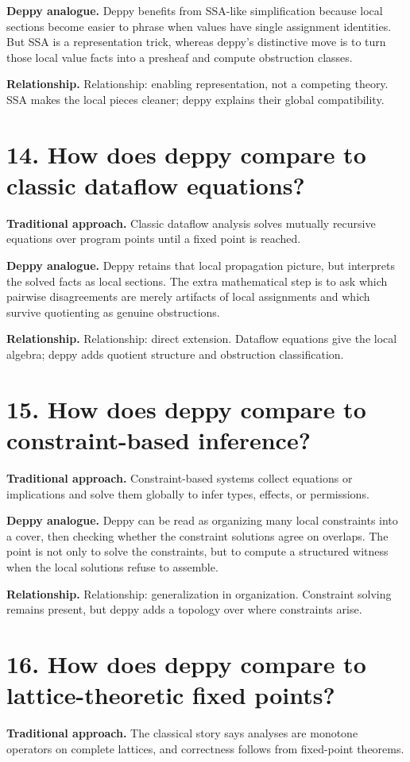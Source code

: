 \documentclass[11pt,openany]{book}
\begin{document}
\textbf{Deppy analogue.} Deppy benefits from SSA-like simplification because local sections become easier to phrase when values have single assignment identities. But SSA is a representation trick, whereas deppy's distinctive move is to turn those local value facts into a presheaf and compute obstruction classes.

\textbf{Relationship.} Relationship: enabling representation, not a competing theory. SSA makes the local pieces cleaner; deppy explains their global compatibility.

\section*{14. How does deppy compare to classic dataflow equations?}
\textbf{Traditional approach.} Classic dataflow analysis solves mutually recursive equations over program points until a fixed point is reached.

\textbf{Deppy analogue.} Deppy retains that local propagation picture, but interprets the solved facts as local sections. The extra mathematical step is to ask which pairwise disagreements are merely artifacts of local assignments and which survive quotienting as genuine obstructions.

\textbf{Relationship.} Relationship: direct extension. Dataflow equations give the local algebra; deppy adds quotient structure and obstruction classification.

\section*{15. How does deppy compare to constraint-based inference?}
\textbf{Traditional approach.} Constraint-based systems collect equations or implications and solve them globally to infer types, effects, or permissions.

\textbf{Deppy analogue.} Deppy can be read as organizing many local constraints into a cover, then checking whether the constraint solutions agree on overlaps. The point is not only to solve the constraints, but to compute a structured witness when the local solutions refuse to assemble.

\textbf{Relationship.} Relationship: generalization in organization. Constraint solving remains present, but deppy adds a topology over where constraints arise.

\section*{16. How does deppy compare to lattice-theoretic fixed points?}
\textbf{Traditional approach.} The classical story says analyses are monotone operators on complete lattices, and correctness follows from fixed-point theorems.
\end{document}
